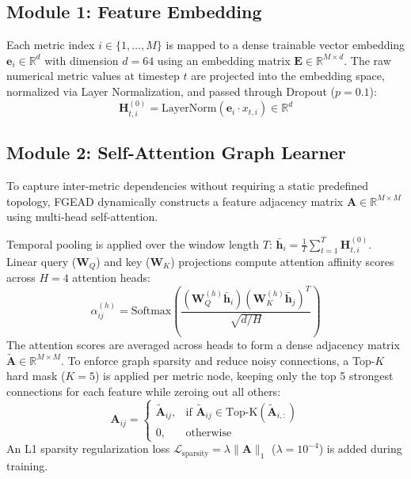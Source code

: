 \documentclass[conference]{IEEEtran}
\begin{document}
\subsection{Module 1: Feature Embedding}
Each metric index $i \in \{1, \dots, M\}$ is mapped to a dense trainable vector embedding $\mathbf{e}_i \in \mathbb{R}^{d}$ with dimension $d = 64$ using an embedding matrix $\mathbf{E} \in \mathbb{R}^{M \times d}$. The raw numerical metric values at timestep $t$ are projected into the embedding space, normalized via Layer Normalization, and passed through Dropout ($p=0.1$):
\begin{equation}
    \mathbf{H}^{(0)}_{t, i} = \text{LayerNorm}(\mathbf{e}_i \cdot x_{t, i}) \in \mathbb{R}^d
\end{equation}

\subsection{Module 2: Self-Attention Graph Learner}
To capture inter-metric dependencies without requiring a static predefined topology, FGEAD dynamically constructs a feature adjacency matrix $\mathbf{A} \in \mathbb{R}^{M \times M}$ using multi-head self-attention.

Temporal pooling is applied over the window length $T$: $\bar{\mathbf{h}}_i = \frac{1}{T}\sum_{t=1}^T \mathbf{H}^{(0)}_{t, i}$. Linear query ($\mathbf{W}_Q$) and key ($\mathbf{W}_K$) projections compute attention affinity scores across $H=4$ attention heads:
\begin{equation}
    \alpha_{ij}^{(h)} = \text{Softmax}\left( \frac{(\mathbf{W}_Q^{(h)} \bar{\mathbf{h}}_i) (\mathbf{W}_K^{(h)} \bar{\mathbf{h}}_j)^T}{\sqrt{d/H}} \right)
\end{equation}
The attention scores are averaged across heads to form a dense adjacency matrix $\tilde{\mathbf{A}} \in \mathbb{R}^{M \times M}$. To enforce graph sparsity and reduce noisy connections, a Top-$K$ hard mask ($K=5$) is applied per metric node, keeping only the top 5 strongest connections for each feature while zeroing out all others:
\begin{equation}
    \mathbf{A}_{ij} = \begin{cases} 
    \tilde{\mathbf{A}}_{ij}, & \text{if } \tilde{\mathbf{A}}_{ij} \in \text{Top-K}(\tilde{\mathbf{A}}_{i, :}) \\
    0, & \text{otherwise}
    \end{cases}
\end{equation}
An L1 sparsity regularization loss $\mathcal{L}_{\text{sparsity}} = \lambda \|\mathbf{A}\|_1$ ($\lambda = 10^{-4}$) is added during training.
\end{document}
